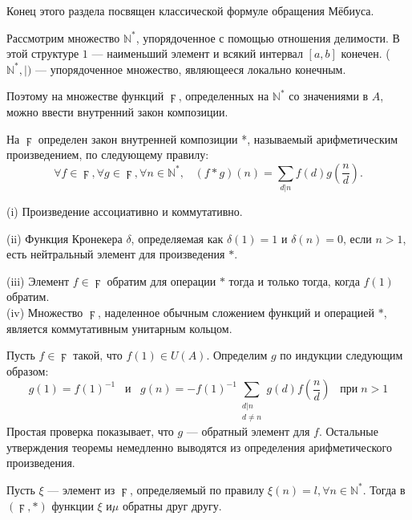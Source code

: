 Конец этого раздела посвящен классической формуле обращения
Мёбиуса.

Рассмотрим множество $\mathbb{N}^*$, упорядоченное с помощью отношения
делимости. В этой структуре $1$ — наименьший элемент и всякий ин­тервал $[a,b]$ конечен. ($\mathbb{N}^*, |)$ — упорядоченное множество, являющееся
локально конечным.

Поэтому на множестве функций $\digamma$, определенных на $\mathbb{N}^*$ со значени­ями в $A$, можно ввести внутренний закон композиции.
\newpage
\begin{determ}
\hspace*{0.5cm}На $\digamma$ определен закон внутренней композиции *, называемый арифметическим произведением, по следующему правилу:
$$\forall f\in\digamma,\forall g\in\digamma,\forall n\in\mathbb{N}^{*},\;\;\;(f*g)(n)=\sum\limits_{d|n}f(d)g\left(\frac{n}{d}\right).$$
\end{determ}
\begin{property}[произведения *]
\hspace*{0.5cm}(i) Произведение ассоциативно и коммутативно.

(ii) Функция Кронекера $\delta$, определяемая как $\delta(1)=1$ и $\delta(n)=0$, если
$n>1$, есть нейтральный элемент для произведения $*$.

(iii) Элемент $f\in\digamma$ обратим для операции $*$ тогда и только тогда,
когда $f(1)$ обратим.\\
(iv) Множество $\digamma$, наделенное обычным сложением функций и операцией $*$, является коммутативным унитарным кольцом.
\end{property}
\begin{myproof}
Пусть $f\in\digamma$ такой, что $f(1)\in U(A)$. Определим $g$ по индукции следующим образом:
$$g(1)=f(1)^{-1}\;\;\;\text{и}\;\;\;g(n)=-f(1)^{-1}\sum_{\substack{d|n{}\\d\neq n}
}g(d)f\left(\frac{n}{d}\right)\;\;\;\text{при}\;n>1$$
Простая проверка показывает, что $g$ — обратный элемент для $f$.
Остальные утверждения теоремы немедленно выводятся из опреде­ления арифметического произведения.
\end{myproof}
\begin{property}
\hspace{0.5cm}Пусть $\xi$ — элемент из $\digamma$, определяемый по правилу $\xi(n)=l,\forall n\in\mathbb{N}^*$. Тогда в $(\digamma,*)$ функции $\xi$ и$\mu$ обратны друг другу.
\end{property}

